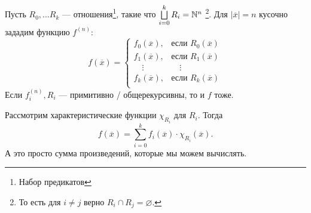 \begin{thm}
	Пусть $ R_0, \ldots R_k $ --- отношения\footnote{Набор предикатов}, такие что $ \bigsqcup\limits_{i=0}^{k} R_i = \mathbb{N}^{n}$
	\footnote{То есть для $ i \ne  j$ верно $ R_{i} \cap R_j = \varnothing$.}.
	Для $ \lvert \overline{x} \rvert = n$ кусочно зададим функцию $ f^{(n)}$:
\[
	f(\overline{x}) = \begin{cases}
		f_0(\overline{x}), & \text{если }R_0(\overline{x}) \\
		f_1(\overline{x}), &  \text{если }R_1(\overline{x}) \\
		\quad\vdots & \quad\vdots \\
		f_k(\overline{x}), &  \text{если }R_k(\overline{x}) \\
	\end{cases}
\] 
Если $ f_i^{(n)}, R_i$ --- примитивно / общерекурсивны, то и $ f$ тоже.
\end{thm}
\begin{proof*}
	Рассмотрим характеристические функции $ \chi_{R_{i}} $ для $ R_i$.
	Тогда 
	\[
		f(\overline{x}) = \sum_{i=0}^{k} f_i(\overline{x}) \cdot \chi_{R_{i}}(\overline{x})
	.\] 
	А это просто сумма произведений, которые мы можем вычислять.
\end{proof*}


